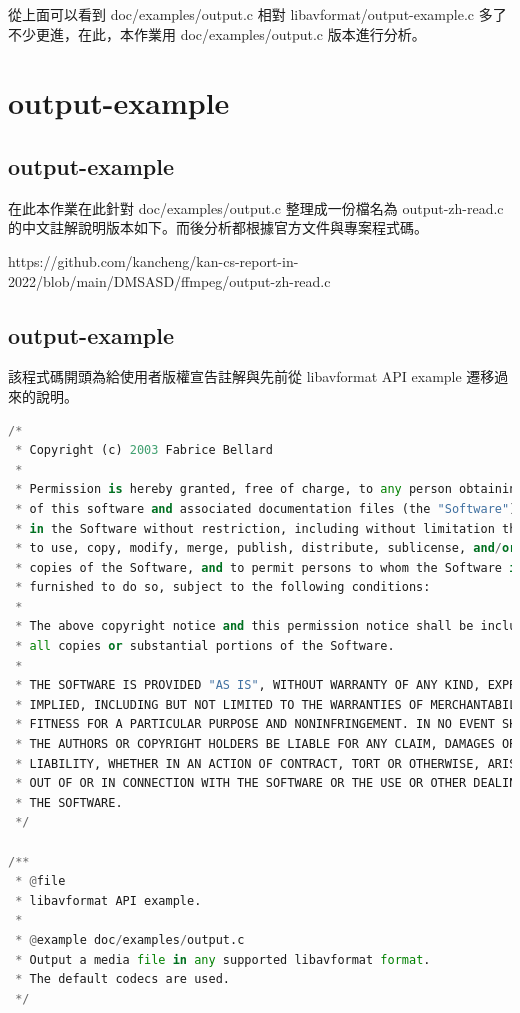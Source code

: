 \documentclass[10pt,UTF8]{ctexart}
\begin{document}
從上面可以看到 doc/examples/output.c 相對 libavformat/output-example.c 多了不少更進，在此，本作業用 doc/examples/output.c 版本進行分析。

\section{output-example}

\subsection{output-example}

在此本作業在此針對  doc/examples/output.c 整理成一份檔名為 output-zh-read.c 的中文註解說明版本如下。而後分析都根據官方文件與專案程式碼。

https://github.com/kancheng/kan-cs-report-in-2022/blob/main/DMSASD/ffmpeg/output-zh-read.c

\subsection{output-example}

該程式碼開頭為給使用者版權宣告註解與先前從 libavformat API example 遷移過來的說明。

\begin{lstlisting}[language={python}]
/*
 * Copyright (c) 2003 Fabrice Bellard
 *
 * Permission is hereby granted, free of charge, to any person obtaining a copy
 * of this software and associated documentation files (the "Software"), to deal
 * in the Software without restriction, including without limitation the rights
 * to use, copy, modify, merge, publish, distribute, sublicense, and/or sell
 * copies of the Software, and to permit persons to whom the Software is
 * furnished to do so, subject to the following conditions:
 *
 * The above copyright notice and this permission notice shall be included in
 * all copies or substantial portions of the Software.
 *
 * THE SOFTWARE IS PROVIDED "AS IS", WITHOUT WARRANTY OF ANY KIND, EXPRESS OR
 * IMPLIED, INCLUDING BUT NOT LIMITED TO THE WARRANTIES OF MERCHANTABILITY,
 * FITNESS FOR A PARTICULAR PURPOSE AND NONINFRINGEMENT. IN NO EVENT SHALL
 * THE AUTHORS OR COPYRIGHT HOLDERS BE LIABLE FOR ANY CLAIM, DAMAGES OR OTHER
 * LIABILITY, WHETHER IN AN ACTION OF CONTRACT, TORT OR OTHERWISE, ARISING FROM,
 * OUT OF OR IN CONNECTION WITH THE SOFTWARE OR THE USE OR OTHER DEALINGS IN
 * THE SOFTWARE.
 */

/**
 * @file
 * libavformat API example.
 *
 * @example doc/examples/output.c
 * Output a media file in any supported libavformat format.
 * The default codecs are used.
 */
\end{lstlisting}
\end{document}

